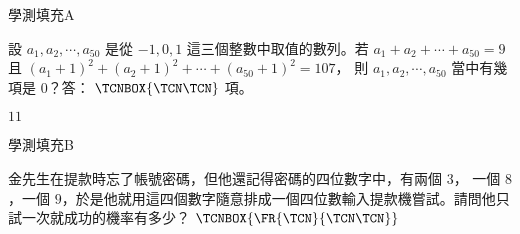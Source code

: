 \begin{QUESTIONS}
    \begin{QUESTION}
        \begin{ExamInfo}{92}{學測}{填充}{A}
        \end{ExamInfo}
        \begin{ExamAnsRateInfo}{37}{74}{31}{6}
        \end{ExamAnsRateInfo}
        \begin{QBODY}
            設 $a_1,a_2,\cdots,a_{50}$ 是從 $-1,0,1$ 這三個整數中取值的數列。若 $a_1 +a_2 + \cdots + a_{50} = 9$ 且 $(a_1+1)^2 +(a_2 +1)^2 + \cdots + (a_{50} +1)^2 =107$， 則 $a_1,a_2,\cdots,a_{50}$ 當中有幾項是 $0$？答： 
            $\TCNBOX{\TCN\TCN}$ 項。
        \end{QBODY}
        \begin{QFROMS}
        \end{QFROMS}
        \begin{QTAGS}\end{QTAGS}
        \begin{QANS}
            $11$
        \end{QANS}
        \begin{QSOLLIST}
        \end{QSOLLIST}
        \begin{QEMPTYSPACE}
        \end{QEMPTYSPACE}
    \end{QUESTION}
    \begin{QUESTION}
        \begin{ExamInfo}{92}{學測}{填充}{B}
        \end{ExamInfo}
        \begin{ExamAnsRateInfo}{64}{93}{70}{29}
        \end{ExamAnsRateInfo}
        \begin{QBODY}
            金先生在提款時忘了帳號密碼，但他還記得密碼的四位數字中，有兩個 $3$， 一個 $8$，一個 $9$，於是他就用這四個數字隨意排成一個四位數輸入提款機嘗試。請問他只試一次就成功的機率有多少？ $\TCNBOX{\FR{\TCN}{\TCN\TCN}}$
        \end{QBODY}
        \begin{QFROMS}
        \end{QFROMS}
        \begin{QTAGS}\end{QTAGS}
        \begin{QANS}

\end{QANS}
\end{QUESTION}
\end{QUESTIONS}
